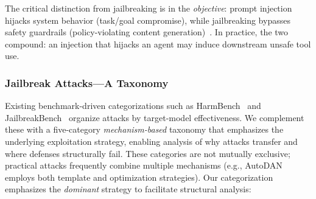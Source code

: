 The critical distinction from jailbreaking is in the \emph{objective}: prompt injection hijacks system behavior (task/goal compromise), while jailbreaking bypasses safety guardrails (policy-violating content generation)~\cite{perez2022ignore,chao2024jailbreakbench}. In practice, the two compound: an injection that hijacks an agent may induce downstream unsafe tool use.


\subsubsection{Jailbreak Attacks---A Taxonomy}
\label{sec:threat-jailbreak}

Existing benchmark-driven categorizations such as HarmBench~\cite{mazeika2024harmbench} and JailbreakBench~\cite{chao2024jailbreakbench} organize attacks by target-model effectiveness. We complement these with a five-category \emph{mechanism-based} taxonomy that emphasizes the underlying exploitation strategy, enabling analysis of why attacks transfer and where defenses structurally fail. These categories are not mutually exclusive; practical attacks frequently combine multiple mechanisms (e.g., AutoDAN employs both template and optimization strategies). Our categorization emphasizes the \emph{dominant} strategy to facilitate structural analysis:

